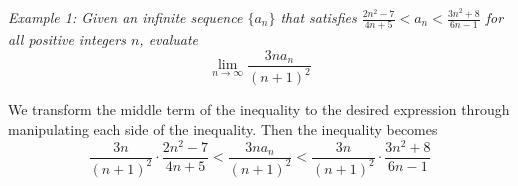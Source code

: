 \documentclass{article}
\begin{document}
            \begin{center}
            \end{center}

            \noindent \color{blue}
            \textit{Example 1: Given an infinite sequence $\{a_n\}$ that satisfies
            $\frac{2n^2-7}{4n+5}<a_n<\frac{3n^2+8}{6n-1}$ for all positive integers $n$, evaluate} \\

            \begin{equation}
                \lim_{n\to \infty}\frac{3na_n}{(n+1)^2}
            \end{equation}

            \color{black} \noindent We transform the middle term of the inequality to the desired
            expression through manipulating each side of the inequality. Then the inequality becomes \\

            \begin{equation*}
                \frac{3n}{(n+1)^2}\cdot\frac{2n^2-7}{4n+5}<\frac{3na_n}{(n+1)^2}<\frac{3n}{(n+1)^2}\cdot\frac{3n^2+8}{6n-1}
            \end{equation*}
\end{document}
